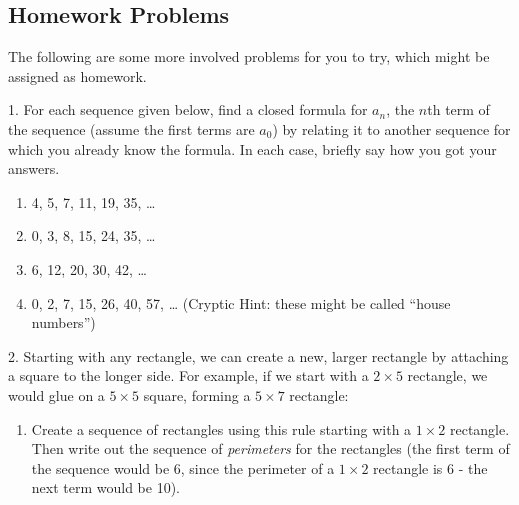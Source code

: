 \documentclass[10pt,]{book}
\theoremstyle{plain}
\theoremstyle{definition}
\theoremstyle{definition}
\theoremstyle{definition}
\numberwithin{equation}{chapter}
\begin{document}
\subsection[Homework Problems]{Homework Problems}\label{exercises-18}

      The following are some more involved problems for you to try, which might be assigned as homework.
\begin{exerciselist}
\item[1.]\hypertarget{exercise-205}{}
            For each sequence given below, find a closed formula for \(a_n\), the \(n\)th term of the sequence (assume the first terms are \(a_0\)) by relating it to another sequence for which you already know the formula. In each case, briefly say how you got your answers.
\leavevmode%
\begin{enumerate}[label=(\alph*)]
\item\hypertarget{li-1013}{}
                4, 5, 7, 11, 19, 35, \dots{}


\item\hypertarget{li-1014}{}
                0, 3, 8, 15, 24, 35, \dots{}


\item\hypertarget{li-1015}{}
                6, 12, 20, 30, 42, \dots{}


\item\hypertarget{li-1016}{}
                0, 2, 7, 15, 26, 40, 57, \dots{} (Cryptic Hint: these might be called ``house numbers'')


\end{enumerate}
\par\smallskip
\item[2.]\hypertarget{exercise-206}{}
            Starting with any rectangle, we can create a new, larger rectangle by attaching a square to the longer side. For example, if we start with a \(2\times 5\) rectangle, we would glue on a \(5\times 5\) square, forming a \(5 \times 7\) rectangle:
\leavevmode%
\begin{figure}
\centering
{
}
\end{figure}
\leavevmode%
\begin{enumerate}[label=(\alph*)]
\item\hypertarget{li-1017}{}
                Create a sequence of rectangles using this rule starting with a \(1\times 2\) rectangle. Then write out the sequence of \emph{perimeters} for the rectangles (the first term of the sequence would be 6, since the perimeter of a \(1\times 2\) rectangle is 6 - the next term would be 10).



\end{enumerate}
\end{exerciselist}
\end{document}
